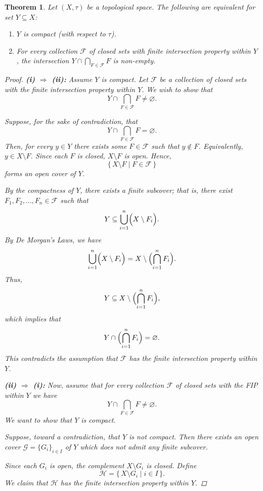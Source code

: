 \documentclass[12pt]{article}
\theoremstyle{bigskipthmstyle}
\theoremstyle{thmstyle}
\newtheorem{theorem}{Theorem}[section]
\theoremstyle{plainstyle}
\newcommand{\cF}{\mathcal{F}}
\begin{document}
\begin{theorem}\label{thm:FIP}
  Let $(X,\tau)$ be a topological space. The following are equivalent for set $Y\subseteq X$:
  \begin{enumerate}
  \item $Y$ is compact (with respect to $\tau$).
  \item For every collection $\cF$ of closed sets with finite intersection property within $Y$, the
    intersection $Y\cap\bigcap_{F\in\cF} F$ is non-empty.
  \end{enumerate}
  
\begin{proof}
\vspace{0.5em}
\textbf{(i) $\Rightarrow$ (ii):} Assume $Y$ is compact. Let 
\(\mathcal{F}\) be a collection of closed sets with the finite intersection property 
within \(Y\). We wish to show that
\[
Y \cap \bigcap_{F\in \mathcal{F}} F \neq \varnothing.
\]

Suppose, for the sake of contradiction, that
\[
Y \cap \bigcap_{F\in \mathcal{F}} F = \varnothing.
\]
Then, for every \(y\in Y\) there exists some \(F\in \mathcal{F}\) such that 
\(y\notin F\). Equivalently, \(y\in X\setminus F\). Since each \(F\) is closed, 
\(X\setminus F\) is open. Hence, 
\[
\{\, X\setminus F \mid F\in \mathcal{F} \,\}
\]
forms an open cover of \(Y\).

By the compactness of \(Y\), there exists a finite subcover; that is, there exist 
\(F_1, F_2, \dots, F_n \in \mathcal{F}\) such that
\[
Y \subseteq \bigcup_{i=1}^n \Bigl(X \setminus F_i\Bigr).
\]
By De Morgan's Laws, we have
\[
\bigcup_{i=1}^n \Bigl(X \setminus F_i\Bigr)
=
X\setminus \Bigl(\bigcap_{i=1}^n F_i\Bigr).
\]
Thus, 
\[
Y \subseteq X \setminus \Bigl(\bigcap_{i=1}^n F_i\Bigr),
\]
which implies that
\[
Y \cap \Bigl(\bigcap_{i=1}^n F_i\Bigr) = \varnothing.
\]
This contradicts the assumption that \(\mathcal{F}\) has the finite intersection property within \(Y\). 

\vspace{0.5em}
\textbf{(ii) $\Rightarrow$ (i):} Now, assume that for every collection 
\(\mathcal{F}\) of closed sets with the FIP within \(Y\) we have
\[
Y \cap \bigcap_{F\in \mathcal{F}} F \neq \varnothing.
\]
We want to show that \(Y\) is compact.

Suppose, toward a contradiction, that \(Y\) is not compact. Then there exists an open 
cover \(\mathcal{G}=\{G_i\}_{i\in I}\) of \(Y\) which does not admit any finite subcover.

Since each \(G_i\) is open, the complement \(X\setminus G_i\) is closed. Define
\[
\mathcal{H} = \{\,X\setminus G_i \mid i\in I\,\}.
\]
We claim that \(\mathcal{H}\) has the finite intersection property within \(Y\).


\end{proof}
\end{theorem}
\end{document}

